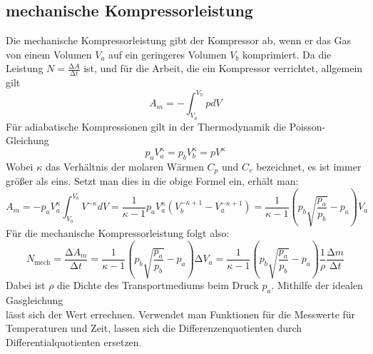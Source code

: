\subsection{mechanische Kompressorleistung}
Die mechanische Kompressorleistung gibt der Kompressor ab, wenn er das Gas von einem Volumen $V_a$ auf ein geringeres Volumen $V_b$ komprimiert. Da die
Leistung $N = \frac{\increment A}{\increment t}$ ist, und für die Arbeit, die ein Kompressor verrichtet, allgemein gilt
\begin{equation}
A_m = - \int_{V_a}^{V_b} p dV
\end{equation}
Für adiabatische Kompressionen gilt in der Thermodynamik die Poisson-Gleichung 
\begin{equation}
p_a V_a^{\kappa} = p_b V_b^{\kappa} = pV^{\kappa}
\end{equation}
Wobei $\kappa$ das Verhältnis der molaren Wärmen $C_p$ und $C_v$ bezeichnet, es ist immer größer als eins. Setzt man dies in die obige Formel ein, erhält man:
\begin{equation}
A_m = -p_a V_a^{\kappa} \int_{V_a}^{V_b} V^{- \kappa} dV = \frac{1}{\kappa - 1} p_a V_a^{\kappa} \left( V_b^{- \kappa + 1} - V_a^{- \kappa + 1} \right) =
    \frac{1}{\kappa - 1} \left( p_b \sqrt{\frac{p_a}{p_b}} - p_a \right) V_a
\end{equation}
Für die mechanische Kompressorleistung folgt also:
\begin{equation}
N_\text{mech} = \frac{\increment A_m}{\increment t} = \frac{1}{\kappa - 1} \left( p_b \sqrt{\frac{p_a}{p_b}} - p_a \right) \increment V_a
    =  \frac{1}{\kappa - 1} \left( p_b \sqrt{\frac{p_a}{p_b}} - p_a \right) \frac{1}{\rho} \frac{\increment m}{\increment t}
\end{equation}
Dabei ist $\rho$ die Dichte des Transportmediums beim Druck $p_a$. Mithilfe der idealen Gasgleichung \\ lässt sich der Wert errechnen.
Verwendet man Funktionen für die Messwerte für Temperaturen und Zeit, lassen sich die Differenzenquotienten durch Differentialquotienten ersetzen.